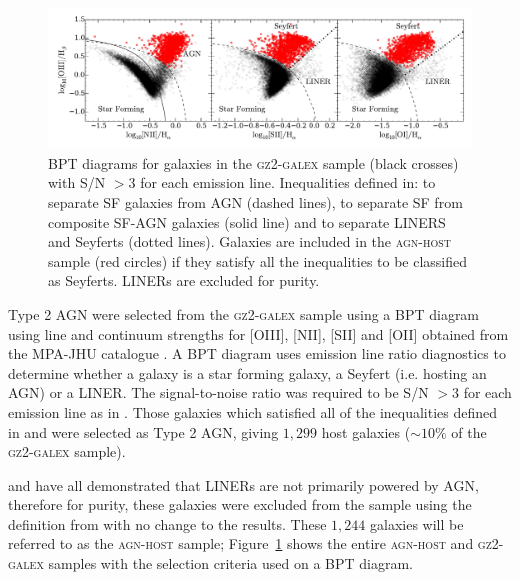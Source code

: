 \begin{figure}
\includegraphics[width=\textwidth]{agn/fig2.pdf}
\caption[BPT diagram used to select AGN host galaxies]{BPT diagrams for galaxies in the \textsc{gz2-galex} sample (black crosses) with S/N $> 3$ for each emission line. Inequalities defined in: \protect\cite{kewley01} to separate SF galaxies from AGN (dashed lines), \protect\cite{kauffmann03b} to separate SF from composite SF-AGN galaxies (solid line) and \protect\cite{kewley06} to separate LINERS and Seyferts (dotted lines). Galaxies are included in the \textsc{agn-host} sample (red circles) if they satisfy all the inequalities to be classified as Seyferts. LINERs are excluded for purity.}
\label{bpt}
\end{figure}

Type 2 AGN were selected from the \textsc{gz2-galex} sample using a BPT diagram \citep{bpt} using line and continuum strengths for [OIII], [NII], [SII] and [OII] obtained from the MPA-JHU catalogue \citep{kauffmann03, brinchmann04}. A BPT diagram uses emission line ratio diagnostics to determine whether a galaxy is a star forming galaxy, a Seyfert (i.e. hosting an AGN) or a LINER. The signal-to-noise ratio was required to be S/N $> 3$ for each emission line as in \cite{schawinski10a}. Those galaxies which satisfied all of the inequalities defined in \citet[][to separate SF galaxies from AGN]{kewley01} and \citet[][to separate SF galaxies from composite SF-AGN galaxies]{kauffmann03b} were selected as Type 2 AGN, giving $1,299$ host galaxies ($\sim10\%$ of the \textsc{gz2-galex} sample).

\cite{Sarzi10, yan12} and \cite{Singh13} have all demonstrated that LINERs are not primarily powered by AGN, therefore for purity, these galaxies were excluded from the sample using the definition from \cite[][$55$ galaxies total]{kewley06} with no change to the results. These $1,244$ galaxies will be referred to as the \textsc{agn-host} sample; Figure~\ref{bpt} shows the entire \textsc{agn-host} and \textsc{gz2-galex} samples with the selection criteria used on a BPT diagram.

